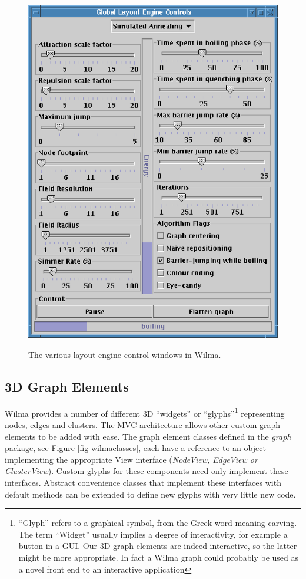 \documentclass[runningheads]{cl2emult}
\begin{document}
\begin{figure}
{{    \includegraphics{figures/wilma-simannealcontrols.eps}}}
  \caption{The various layout engine control windows in Wilma.}
\end{figure}

\subsection{3D Graph Elements}
Wilma provides a number of different 3D
``widgets'' or ``glyphs''\footnote{``Glyph'' refers to a graphical
symbol, from the Greek word meaning carving. 
The term ``Widget'' usually implies a degree of interactivity, for
example a button in a GUI.  Our 3D graph elements are indeed
interactive, so the latter might be more appropriate.  
In fact a Wilma graph could probably be used as a novel front
end to an interactive application}
representing nodes, edges and clusters.
The MVC architecture allows other custom graph elements to be added
with ease.  The graph element classes defined in the {\em graph}
package, see Figure \ref{fig-wilmaclasses}, each have a reference to
an object implementing the appropriate View interface ({\em NodeView, EdgeView or ClusterView}).
Custom glyphs for these components need only implement these
interfaces.  Abstract convenience classes that implement these
interfaces with default methods can be extended to define new glyphs
with very little new code.
\end{document}
